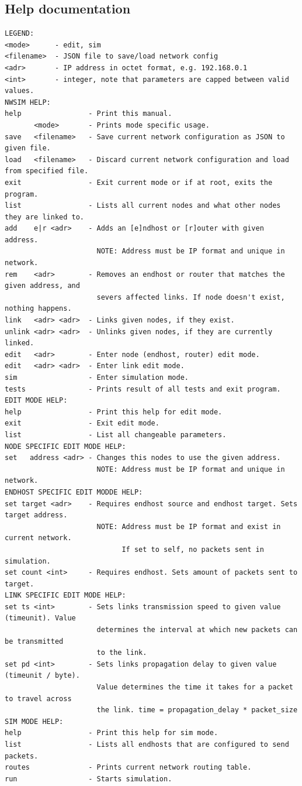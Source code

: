 \subsection{Help documentation} \label{sec:help}
\lstset{basicstyle=\scriptsize}
\begin{lstlisting}
LEGEND:
<mode>      - edit, sim
<filename>  - JSON file to save/load network config
<adr>       - IP address in octet format, e.g. 192.168.0.1
<int>       - integer, note that parameters are capped between valid values.
NWSIM HELP:
help                - Print this manual.
       <mode>       - Prints mode specific usage.
save   <filename>   - Save current network configuration as JSON to given file.
load   <filename>   - Discard current network configuration and load from specified file.
exit                - Exit current mode or if at root, exits the program.
list                - Lists all current nodes and what other nodes they are linked to.
add    e|r <adr>    - Adds an [e]ndhost or [r]outer with given address.
                      NOTE: Address must be IP format and unique in network.
rem    <adr>        - Removes an endhost or router that matches the given address, and
                      severs affected links. If node doesn't exist, nothing happens.
link   <adr> <adr>  - Links given nodes, if they exist.
unlink <adr> <adr>  - Unlinks given nodes, if they are currently linked.
edit   <adr>        - Enter node (endhost, router) edit mode.
edit   <adr> <adr>  - Enter link edit mode.
sim                 - Enter simulation mode.
tests               - Prints result of all tests and exit program.
EDIT MODE HELP:
help                - Print this help for edit mode.
exit                - Exit edit mode.
list                - List all changeable parameters.
NODE SPECIFIC EDIT MODE HELP:
set   address <adr> - Changes this nodes to use the given address.
                      NOTE: Address must be IP format and unique in network.
ENDHOST SPECIFIC EDIT MODDE HELP:
set target <adr>    - Requires endhost source and endhost target. Sets target address.
                      NOTE: Address must be IP format and exist in current network.
                            If set to self, no packets sent in simulation.
set count <int>     - Requires endhost. Sets amount of packets sent to target.
LINK SPECIFIC EDIT MODE HELP:
set ts <int>        - Sets links transmission speed to given value (timeunit). Value 
                      determines the interval at which new packets can be transmitted
                      to the link.
set pd <int>        - Sets links propagation delay to given value (timeunit / byte).
                      Value determines the time it takes for a packet to travel across
                      the link. time = propagation_delay * packet_size
SIM MODE HELP:
help                - Print this help for sim mode.
list                - Lists all endhosts that are configured to send packets.
routes              - Prints current network routing table.
run                 - Starts simulation.
\end{lstlisting}

